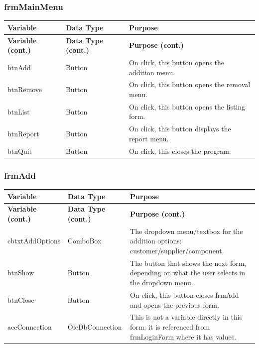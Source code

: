 	\subsubsection{frmMainMenu}
	\begin{longtable}{ | p{4cm} | p{3cm} | p{10cm} | }
		\hline
		\textbf{Variable} & \textbf{Data Type} & \textbf{Purpose}\\
		\endfirsthead
		\hline
		\textbf{Variable (cont.)} & \textbf{Data Type (cont.)} & \textbf{Purpose (cont.)}\\
		\endhead
		\hline
		btnAdd & Button & On click, this button opens the addition menu.\\
		\hline
		btnRemove & Button & On click, this button opens the removal menu.\\
		\hline
		btnList & Button & On click, this button opens the listing form.\\
		\hline
		btnReport & Button & On click, this button displays the report menu.\\
		\hline
		btnQuit & Button & On click, this closes the program.\\
		\hline
	\end{longtable}

	\subsubsection{frmAdd}
	\begin{longtable}{| p{4cm} | p{3cm} | p{10cm} |}
		\hline
		\textbf{Variable} & \textbf{Data Type} & \textbf{Purpose}\\
		\endfirsthead
		\hline
		\textbf{Variable (cont.)} & \textbf{Data Type (cont.)} & \textbf{Purpose (cont.)}\\
		\endhead
		\hline
		cbtxtAddOptions & ComboBox & The dropdown menu\slash textbox for the addition options: customer\slash supplier\slash component.\\
		\hline
		btnShow & Button & The button that shows the next form, depending on what the user selects in the dropdown menu.\\
		\hline
		btnClose & Button & On click, this button closes frmAdd and opens the previous form.\\
		\hline
		accConnection & OleDbConnection & This is not a variable directly in this form: it is referenced from frmLoginForm where it has values.\\
		\hline
	\end{longtable}
	
